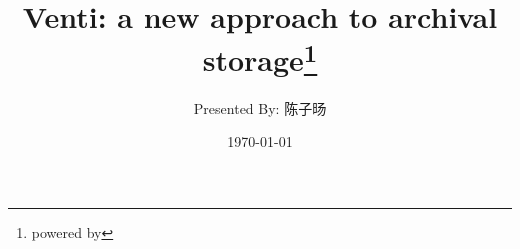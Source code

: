 \documentclass[mathserif]{beamer}
\title[Venti]{Venti: a new approach to archival storage\thanks{powered by \XeLaTeX}}
\author{Presented By: 陈子旸}
\institute[FDU]
{
	Fudan University\\
	\medskip
	\textit{13307130148@fudan.edu.cn}
}
\date{\today}
\begin{document}
\newtheorem{property}[theorem]{\textsc{Property}}
\newtheorem{defination}[theorem]{\textsc{Defination}}
\newtheorem{theore}[theorem]{\textsc{Theorem}}
\newtheorem{lemm}[theorem]{\textsc{Lemma}}

\begin{frame}
\titlepage
\end{frame}



\end{document}
